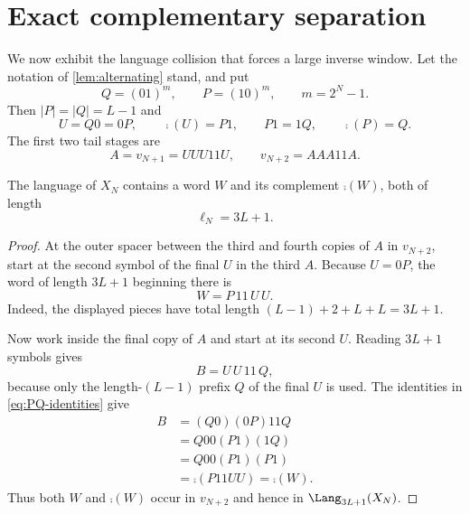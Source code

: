 \section{Exact complementary separation}

We now exhibit the language collision that forces a large inverse window.  Let
the notation of \cref{lem:alternating} stand, and put
\begin{equation}\label{eq:PQ-def}
 Q=(01)^m,\qquad P=(10)^m,\qquad m=2^N-1.
\end{equation}
Then $|P|=|Q|=L-1$ and
\begin{equation}\label{eq:PQ-identities}
 U=Q0=0P,\qquad \comp(U)=P1,\qquad P1=1Q,\qquad \comp(P)=Q.
\end{equation}
The first two tail stages are
\begin{equation}\label{eq:A-def}
 A=v_{N+1}=UUU11U,\qquad v_{N+2}=AAA11A.
\end{equation}

\begin{lemma}\label{lem:witness}
The language of $X_N$ contains a word $W$ and its complement $\comp(W)$, both
of length
\[
 \ell_N=3L+1.
\]
\end{lemma}

\begin{proof}
At the outer spacer between the third and fourth copies of $A$ in
$v_{N+2}$, start at the second symbol of the final $U$ in the third $A$.
Because $U=0P$, the word of length $3L+1$ beginning there is
\begin{equation}\label{eq:W-def}
 W=P\,11\,U\,U.
\end{equation}
Indeed, the displayed pieces have total length
$(L-1)+2+L+L=3L+1$.

Now work inside the final copy of $A$ and start at its second $U$.  Reading
$3L+1$ symbols gives
\begin{equation}\label{eq:B-def}
 B=U\,U\,11\,Q,
\end{equation}
because only the length-$(L-1)$ prefix $Q$ of the final $U$ is used.  The
identities in \eqref{eq:PQ-identities} give
\begin{align*}
 B
 &= (Q0)(0P)11Q\\
 &=Q00(P1)(1Q)\\
 &=Q00(P1)(P1)\\
 &=\comp(P11UU)=\comp(W).
\end{align*}
Thus both $W$ and $\comp(W)$ occur in $v_{N+2}$ and hence in
$\Lang_{3L+1}(X_N)$.
\end{proof}

